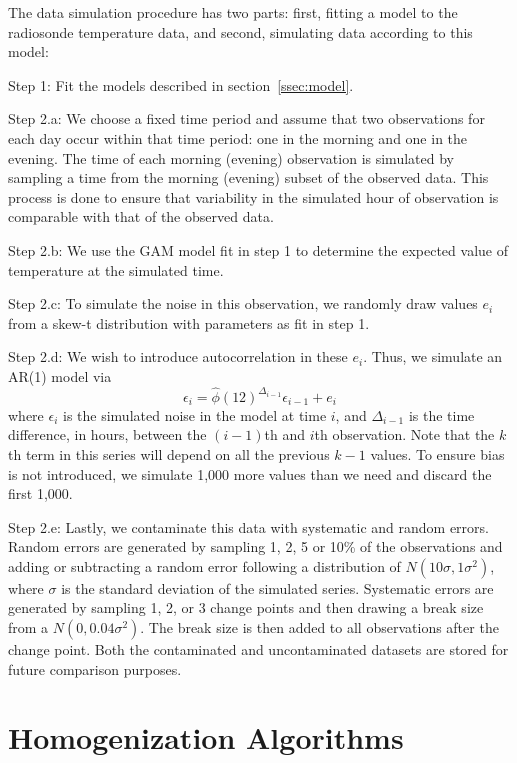 \documentclass[12pt]{article}
\begin{document}
\begin{doublespacing}
The data simulation procedure has two parts: first, fitting a model to the radiosonde temperature data, and second, simulating data according to this model:

Step 1: Fit the models described in section~\ref{ssec:model}.

Step 2.a: We choose a fixed time period and assume that two observations for each day occur within that time period: one in the morning and one in the evening.  The time of each morning (evening) observation is simulated by sampling a time from the morning (evening) subset of the observed data.  This process is done to ensure that variability in the simulated hour of observation is comparable with that of the observed data.

Step 2.b: We use the GAM model fit in step 1 to determine the expected value of temperature at the simulated time.

Step 2.c: To simulate the noise in this observation, we randomly draw values $e_i$ from a skew-t distribution with parameters as fit in step 1.

Step 2.d: We wish to introduce autocorrelation in these $e_i$.  Thus, we simulate an AR(1) model via
\begin{equation*}
	\epsilon_i = \widehat{\phi}(12)^{\Delta_{i-1}} \epsilon_{i-1} + e_i
\end{equation*}
where $\epsilon_i$ is the simulated noise in the model at time $i$, and $\Delta_{i-1}$ is the time difference, in hours, between the $(i-1)$th and $i$th observation.  Note that the $k$th term in this series will depend on all the previous $k-1$ values.  To ensure bias is not introduced, we simulate 1,000 more values than we need and discard the first 1,000.

Step 2.e: Lastly, we contaminate this data with systematic and random errors.  Random errors are generated by sampling 1, 2, 5 or 10\% of the observations and adding or subtracting a random error following a distribution of $N(10\sigma,1\sigma^2)$, where $\sigma$ is the standard deviation of the simulated series.  Systematic errors are generated by sampling 1, 2, or 3 change points and then drawing a break size from a $N(0,0.04 \sigma^2)$.  The break size is then added to all observations after the change point.  Both the contaminated and uncontaminated datasets are stored for future comparison purposes.

\section{Homogenization Algorithms}


\end{doublespacing}
\end{document}
